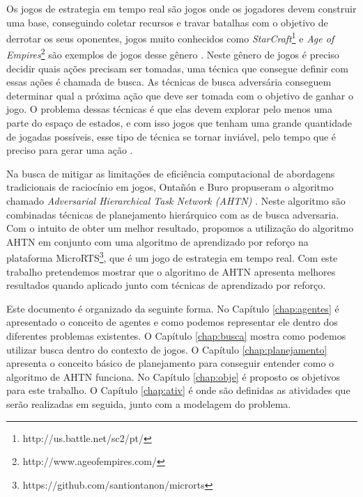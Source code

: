 Os jogos de estrategia em tempo real são jogos onde os jogadores devem construir uma base, conseguindo coletar recursos e travar batalhas com o objetivo de derrotar os seus oponentes, jogos muito conhecidos como \textit{StarCraft}\footnote{http://us.battle.net/sc2/pt/} e \textit{Age of Empires}\footnote{http://www.ageofempires.com/} são exemplos de jogos desse gênero \cite{ontanon2013survey}.
Neste gênero de jogos é preciso decidir quais ações precisam ser tomadas, uma técnica que consegue definir com essas ações é chamada de busca. 
As técnicas de busca adversária conseguem determinar qual a próxima ação que deve ser tomada com o objetivo de ganhar o jogo. O problema dessas técnicas é que elas devem explorar pelo menos uma parte do espaço de estados, e com isso jogos que tenham uma grande quantidade de jogadas possíveis, esse tipo de técnica se tornar inviável, pelo tempo que é preciso para gerar uma ação \cite{ontanon2012experiments}. 

Na busca de mitigar as limitações de eficiência computacional de abordagens tradicionais de raciocínio em jogos, Ontañón e Buro propuseram o algoritmo chamado \textit{Adversarial Hierarchical Task Network (AHTN)} \cite{ontanon2015adversarial}. 
Neste algoritmo são combinadas técnicas de planejamento hierárquico com as de busca adversaria. 
Com o intuito de obter um melhor resultado, propomos a utilização do algoritmo AHTN em conjunto com uma algoritmo de aprendizado por reforço na plataforma MicroRTS\footnote{https://github.com/santiontanon/microrts}, que é um jogo de estrategia em tempo real. 
Com este trabalho pretendemos mostrar que o algoritmo de AHTN apresenta melhores resultados quando aplicado junto com técnicas de aprendizado por reforço. 

Este documento é organizado da seguinte forma. No Capítulo \ref{chap:agentes} é apresentado o conceito de agentes e como podemos representar ele dentro dos diferentes problemas existentes. O Capítulo \ref{chap:busca} mostra como podemos utilizar busca dentro do contexto de jogos. O Capítulo \ref{chap:planejamento} apresenta o conceito básico de planejamento para conseguir entender como o algoritmo de AHTN funciona. No Capítulo \ref{chap:obje} é proposto os objetivos para este trabalho. O Capítulo \ref{chap:ativ} é onde são definidas as atividades que serão realizadas em seguida, junto com a modelagem do problema.   
